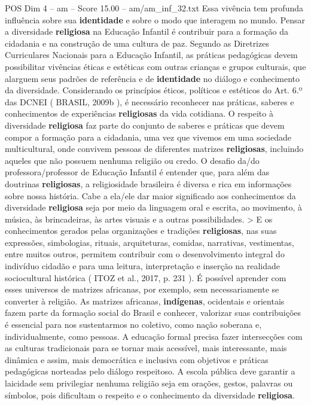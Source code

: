 \begin{textsample}{POS Dim 4 – am – Score 15.00 – am/am\_inf\_32.txt}
Essa vivência tem profunda influência sobre sua \textbf{identidade} e sobre o modo que interagem no mundo.
Pensar a diversidade \textbf{religiosa} na Educação Infantil é contribuir para a formação da cidadania e na construção de uma cultura de paz.
Segundo as Diretrizes Curriculares Nacionais para a Educação Infantil, as práticas pedagógicas devem possibilitar vivências éticas e estéticas com outras crianças e grupos culturais, que alarguem seus padrões de referência e de \textbf{identidade} no diálogo e conhecimento da diversidade.
Considerando os princípios éticos, políticos e estéticos do Art. 6.º das DCNEI ( BRASIL, 2009b ), é necessário reconhecer nas práticas, saberes e conhecimentos de experiências \textbf{religiosas} da vida cotidiana.
O respeito à diversidade \textbf{religiosa} faz parte do conjunto de saberes e práticas que devem compor a formação para a cidadania, uma vez que vivemos em uma sociedade multicultural, onde convivem pessoas de diferentes matrizes \textbf{religiosas}, incluindo aqueles que não possuem nenhuma religião ou credo.
O desafio da/do professora/professor de Educação Infantil é entender que, para além das doutrinas \textbf{religiosas}, a religiosidade brasileira é diversa e rica em informações sobre nossa história.
Cabe a ela/ele dar maior significado aos conhecimentos da diversidade \textbf{religiosa} seja por meio da linguagem oral e escrita, ao movimento, à música, às brincadeiras, às artes visuais e a outras possibilidades. > E os conhecimentos gerados pelas organizações e tradições \textbf{religiosas}, nas suas expressões, simbologias, rituais, arquiteturas, comidas, narrativas, vestimentas, entre muitos outros, permitem contribuir com o desenvolvimento integral do indivíduo cidadão e para uma leitura, interpretação e inserção na realidade sociocultural histórica ( ITOZ et al., 2017, p. 231 ).
É possível aprender com esses universos de matrizes africanas, por exemplo, sem necessariamente se converter à religião.
As matrizes africanas, \textbf{indígenas}, ocidentais e orientais fazem parte da formação social do Brasil e conhecer, valorizar suas contribuições é essencial para nos sustentarmos no coletivo, como nação soberana e, individualmente, como pessoas.
A educação formal precisa fazer intersecções com as culturas tradicionais para se tornar mais acessível, mais interessante, mais dinâmica e assim, mais democrática e inclusiva com objetivos e práticas pedagógicas norteadas pelo diálogo respeitoso.
A escola pública deve garantir a laicidade sem privilegiar nenhuma religião seja em orações, gestos, palavras ou símbolos, pois dificultam o respeito e o conhecimento da diversidade \textbf{religiosa}.

\end{textsample}
